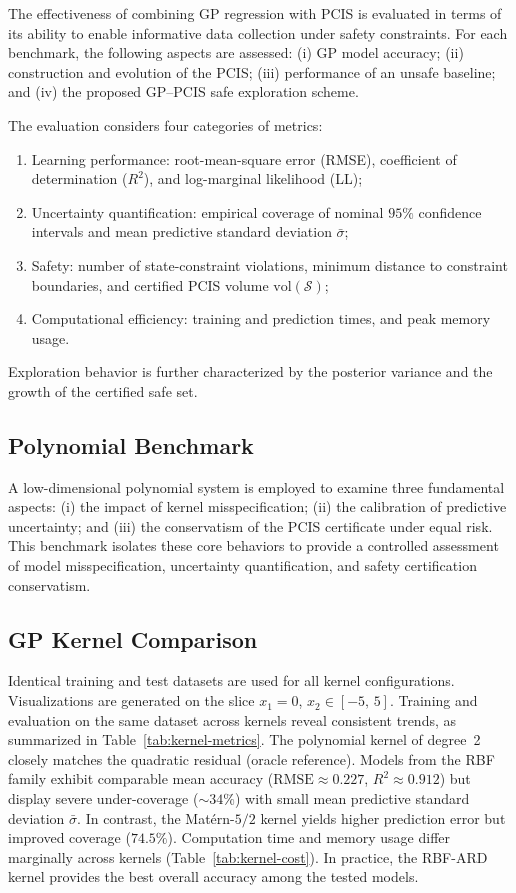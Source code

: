 \documentclass[10pt]{article}
\newcommand{\1}{\mathbbm{1}}
\begin{document}
The effectiveness of combining GP regression with PCIS is evaluated in terms of its ability to enable informative data collection under safety constraints. For each benchmark, the following aspects are assessed:  
(i) GP model accuracy;  
(ii) construction and evolution of the PCIS;  
(iii) performance of an unsafe baseline; and  
(iv) the proposed GP--PCIS safe exploration scheme.

The evaluation considers four categories of metrics:  
%
\begin{enumerate}
    \item Learning performance: root-mean-square error (RMSE), coefficient of determination ($R^2$), and log-marginal likelihood (LL);
    \item Uncertainty quantification: empirical coverage of nominal $95\%$ confidence intervals and mean predictive standard deviation $\bar{\sigma}$;
    \item Safety: number of state-constraint violations, minimum distance to constraint boundaries, and certified PCIS volume $\mathrm{vol}(\mathcal{S})$;
    \item Computational efficiency: training and prediction times, and peak memory usage.
\end{enumerate}
%
Exploration behavior is further characterized by the posterior variance and the growth of the certified safe set.

\subsection{Polynomial Benchmark}
\label{sec:results:poly}
A low-dimensional polynomial system is employed to examine three fundamental aspects:  
(i) the impact of kernel misspecification;  
(ii) the calibration of predictive uncertainty; and  
(iii) the conservatism of the PCIS certificate under equal risk.  
This benchmark isolates these core behaviors to provide a controlled assessment of model misspecification, uncertainty quantification, and safety certification conservatism.

\subsection{GP Kernel Comparison}
\label{sec:kernel-comparison}
Identical training and test datasets are used for all kernel configurations. Visualizations are generated on the slice $x_1{=}0$, $x_2 \in [-5,\,5]$. Training and evaluation on the same dataset across kernels reveal consistent trends, as summarized in Table~\ref{tab:kernel-metrics}. The polynomial kernel of degree~2 closely matches the quadratic residual (oracle reference).  
Models from the RBF family exhibit comparable mean accuracy ($\mathrm{RMSE} \approx 0.227$, $R^2 \approx 0.912$) but display severe under-coverage ($\sim 34\%$) with small mean predictive standard deviation $\bar{\sigma}$. In contrast, the Matérn-$5/2$ kernel yields higher prediction error but improved coverage ($74.5\%$). Computation time and memory usage differ marginally across kernels (Table~\ref{tab:kernel-cost}). In practice, the RBF-ARD kernel provides the best overall accuracy among the tested models.
\end{document}
